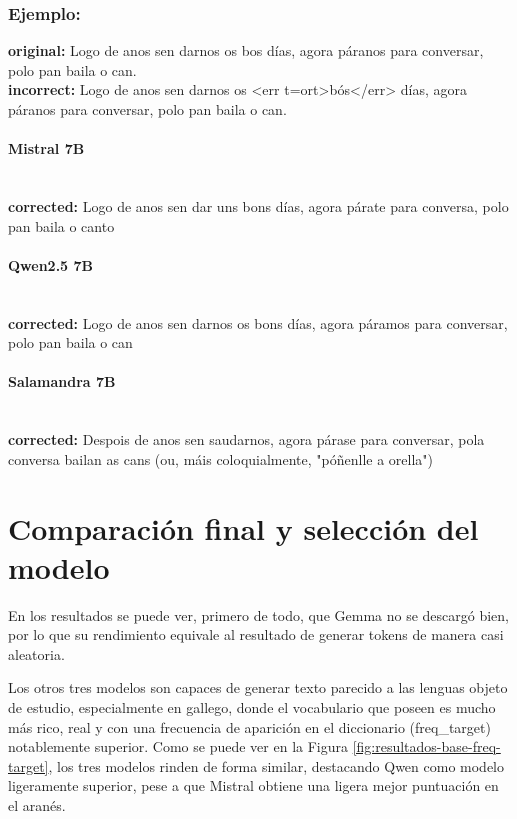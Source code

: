 \subsubsection{Ejemplo:}
\textbf{original:} Logo de anos sen darnos os bos días, agora páranos para conversar, polo pan baila o can.\\
\textbf{incorrect:} Logo de anos sen darnos os {\textless}err t=ort{\textgreater}bós{\textless}/err{\textgreater} días, agora páranos para conversar, polo pan baila o can.

\paragraph{Mistral 7B}~\\
\textbf{corrected:} Logo de anos sen dar uns bons días, agora párate para conversa, polo pan baila o canto

\paragraph{Qwen2.5 7B}~\\
\textbf{corrected:} Logo de anos sen darnos os bons días, agora páramos para conversar, polo pan baila o can

\paragraph{Salamandra 7B}~\\
\textbf{corrected:} Despois de anos sen saudarnos, agora párase para conversar, pola conversa bailan as cans (ou, máis coloquialmente, "póñenlle a orella")

\vspace{1em}

\section{Comparación final y selección del modelo}

En los resultados se puede ver, primero de todo, que Gemma no se descargó bien, por lo que su rendimiento equivale al resultado de generar tokens de manera casi aleatoria.

Los otros tres modelos son capaces de generar texto parecido a las lenguas objeto de estudio, especialmente en gallego, donde el vocabulario que poseen es mucho más rico, real y con una frecuencia de aparición en el diccionario (freq\_target) notablemente superior. Como se puede ver en la Figura \ref{fig:resultados-base-freq-target}, los tres modelos rinden de forma similar, destacando Qwen como modelo ligeramente superior, pese a que Mistral obtiene una ligera mejor puntuación en el aranés.

